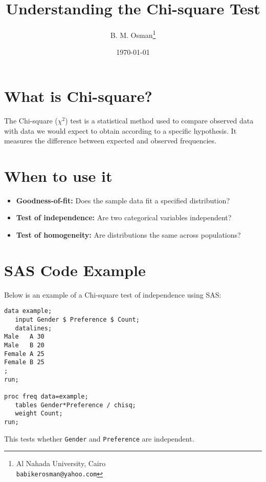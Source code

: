 \documentclass[12pt]{article}
\title{\textcolor{titleColor}{\textbf{\Huge \textbf{Understanding the Chi-square Test}}}}
\author{B. M. Osman\thanks{Al Nahada University, Cairo \\ \texttt{babikerosman@yahoo.com}}}
\date{\today}
\begin{document}
\maketitle


\section*{What is Chi-square?}

The Chi-square ($\chi^2$) test is a statistical method used to compare observed data with data we would expect to obtain according to a specific hypothesis. It measures the difference between expected and observed frequencies.

\section*{When to use it}

\begin{itemize}
  \item \textbf{Goodness-of-fit:} Does the sample data fit a specified distribution?
  \item \textbf{Test of independence:} Are two categorical variables independent?
  \item \textbf{Test of homogeneity:} Are distributions the same across populations?
\end{itemize}

\section*{SAS Code Example}

Below is an example of a Chi-square test of independence using SAS:

\begin{verbatim}
data example;
   input Gender $ Preference $ Count;
   datalines;
Male   A 30
Male   B 20
Female A 25
Female B 25
;
run;

proc freq data=example;
   tables Gender*Preference / chisq;
   weight Count;
run;
\end{verbatim}

This tests whether \texttt{Gender} and \texttt{Preference} are independent.
\end{document}
